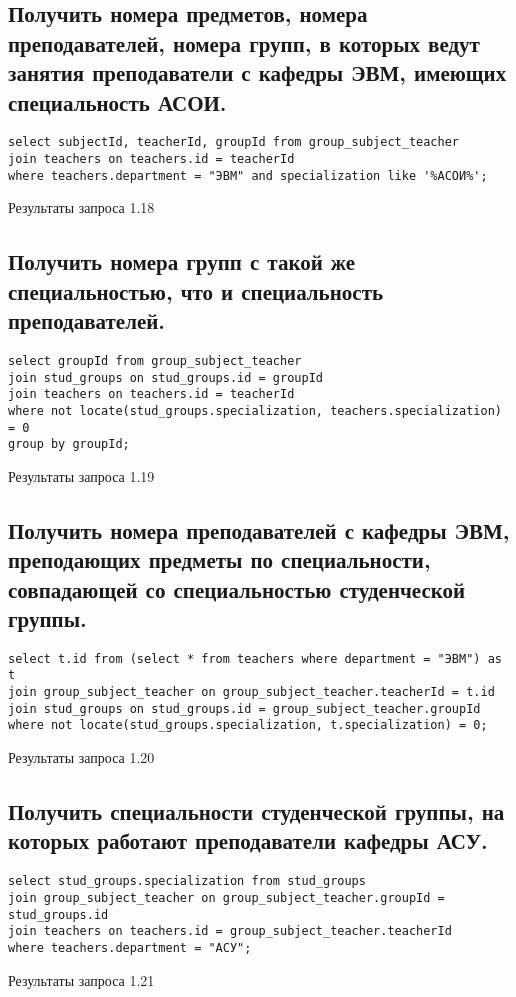 \documentclass[a4paper,8pt]{article}
\begin{document}
\subsection{Получить номера предметов, номера преподавателей, номера групп, в которых ведут занятия преподаватели с кафедры ЭВМ, имеющих специальность АСОИ.}
\begin{verbatim}
select subjectId, teacherId, groupId from group_subject_teacher
join teachers on teachers.id = teacherId
where teachers.department = "ЭВМ" and specialization like '%АСОИ%';
\end{verbatim}
\begin{table}[H]
\centering

\caption{Результаты запроса 1.18}
\end{table}

\subsection{Получить номера групп с такой же специальностью, что и специальность преподавателей.}
\begin{verbatim}
select groupId from group_subject_teacher
join stud_groups on stud_groups.id = groupId
join teachers on teachers.id = teacherId
where not locate(stud_groups.specialization, teachers.specialization) = 0
group by groupId;
\end{verbatim}
\begin{table}[H]
\centering

\caption{Результаты запроса 1.19}
\end{table}

\subsection{Получить номера преподавателей с кафедры ЭВМ, преподающих предметы по специальности, совпадающей со специальностью студенческой группы.}
\begin{verbatim}
select t.id from (select * from teachers where department = "ЭВМ") as t
join group_subject_teacher on group_subject_teacher.teacherId = t.id
join stud_groups on stud_groups.id = group_subject_teacher.groupId
where not locate(stud_groups.specialization, t.specialization) = 0;
\end{verbatim}
\begin{table}[H]
\centering

\caption{Результаты запроса 1.20}
\end{table}

\subsection{Получить специальности студенческой группы, на которых работают преподаватели кафедры АСУ.}
\begin{verbatim}
select stud_groups.specialization from stud_groups
join group_subject_teacher on group_subject_teacher.groupId = stud_groups.id
join teachers on teachers.id = group_subject_teacher.teacherId
where teachers.department = "АСУ";
\end{verbatim}
\begin{table}[H]
\centering

\caption{Результаты запроса 1.21}
\end{table}
\end{document}

